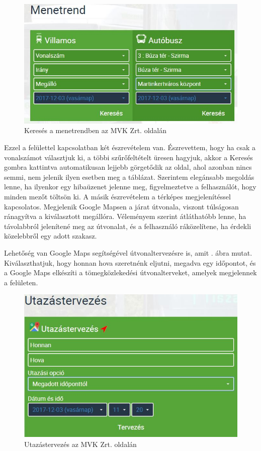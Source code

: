 \begin{figure}[h!]
\centering
\includegraphics[scale=0.7]{kepek/MVK_menetrend.jpg}
\caption{Keresés a menetrendben az MVK Zrt. oldalán}
\label{fig:MVK_menetrend}
\end{figure}

Ezzel a felülettel kapcsolatban két észrevételem van. Észrevettem, hogy ha csak a vonalszámot választjuk ki, a többi szűrőfeltételt üresen hagyjuk, akkor a Keresés gombra kattintva automatikusan lejjebb görgetődik az oldal, ahol azonban nincs semmi, nem jelenik ilyen esetben meg a táblázat. Szerintem elegánsabb megoldás lenne, ha ilyenkor egy hibaüzenet jelenne meg, figyelmeztetve a felhasználót, hogy minden mezőt töltsön ki. A másik észrevételem a térképes megjelenítéssel kapcsolatos. Megjelenik Google Mapsen a járat útvonala, viszont túlságosan ránagyítva a kiválasztott megállóra. Véleményem szerint átláthatóbb lenne, ha távolabbról jelenítené meg az útvonalat, és a felhasználó ráközelítene, ha érdekli közelebbről egy adott szakasz.

Lehetőség van Google Maps segítségével útvonaltervezésre is, amit . ábra mutat. Kiválaszthatjuk, hogy honnan hova szeretnénk eljutni, megadva egy időpontot, és a Google Maps elkészíti a tömegközlekedési útvonalterveket, amelyek megjelennek a felületen.

\begin{figure}[h!]
\centering
\includegraphics[scale=0.7]{kepek/MVK_utazastervezes.jpg}
\caption{Utazástervezés az MVK Zrt. oldalán}
\label{fig:MVK_utazastervezes}
\end{figure}

